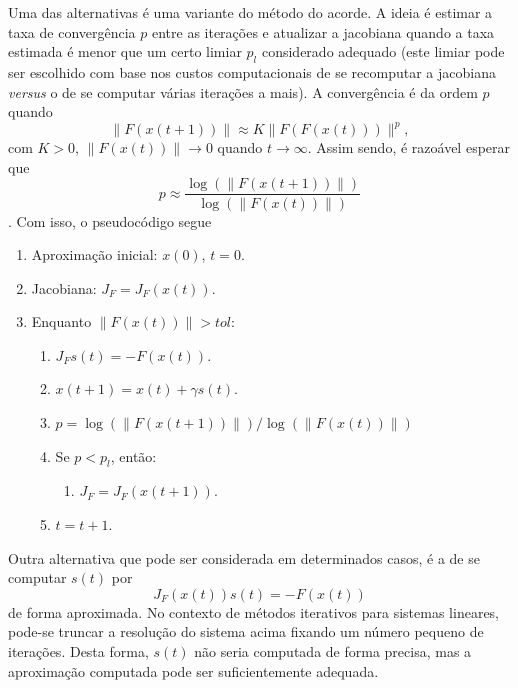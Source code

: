 Uma das alternativas é uma variante do método do acorde. A ideia é estimar a taxa de convergência $p$ entre as iterações e atualizar a jacobiana quando a taxa estimada é menor que um certo limiar $p_l$ considerado adequado (este limiar pode ser escolhido com base nos custos computacionais de se recomputar a jacobiana {\it versus} o de se computar várias iterações a mais). A convergência é da ordem $p$ quando
\begin{equation}
  \|F\left(x(t+1)\right)\| \approx K\|F\left(F(x(t))\right)\|^p,
\end{equation}
com $K>0$, $\|F\left(x(t)\right)\|\to 0$ quando $t\to \infty$. Assim sendo, é razoável esperar que
\begin{equation}
  p \approx \frac{\log\left(\|F\left(x(t+1)\right)\|\right)}{\log\left(\|F\left(x(t)\right)\|\right)}
\end{equation}.
Com isso, o pseudocódigo segue
\begin{enumerate}
\item Aproximação inicial: $x(0)$, $t=0$.
\item Jacobiana: $J_{F} = J_F\left(x(t)\right)$.
\item Enquanto $\|F\left(x(t)\right)\|>tol$:
  \begin{enumerate}
  \item $J_Fs(t) = -F\left(x(t)\right)$.
  \item $x(t+1) = x(t) + \gamma s(t)$.
  \item $p = \log\left(\|F\left(x(t+1)\right)\|\right)/\log\left(\|F\left(x(t)\right)\|\right)$
  \item Se $p < p_l$, então:
    \begin{enumerate}
    \item $J_{F} = J_F\left(x(t+1)\right)$.
    \end{enumerate}
  \item $t = t + 1$.
  \end{enumerate}
\end{enumerate}

Outra alternativa que pode ser considerada em determinados casos, é a de se computar $s(t)$ por
\begin{equation}
  J_F\left(x(t)\right)s(t) = -F\left(x(t)\right)
\end{equation}
de forma aproximada. No contexto de métodos iterativos para sistemas lineares, pode-se truncar a resolução do sistema acima fixando um número pequeno de iterações. Desta forma, $s(t)$ não seria computada de forma precisa, mas a aproximação computada pode ser suficientemente adequada.

